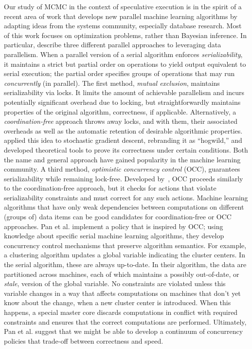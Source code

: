 \documentclass[angelino.tex]{subfiles}
\begin{document}
Our study of MCMC in the context of speculative execution is in the spirit of
a recent area of work that develops new parallel machine learning algorithms
by adapting ideas from the systems community, especially database research.
Most of this work focuses on optimization problems, rather than Bayesian inference.
%
In particular, \citet{pan:2013-optimistic} describe three different parallel
approaches to leveraging data parallelism.
%
When a parallel version of a serial algorithm enforces \emph{serializability},
it maintains a strict but partial order on operations to yield output equivalent
to serial execution; the partial order specifies groups of operations that may
run \emph{concurrently} (in parallel).
%
The first method, \emph{mutual exclusion}, maintains serializability via locks.
It limits the amount of achievable parallelism
and incurs potentially significant overhead due to locking,
but straightforwardly maintains properties of the original algorithm,
\eg correctness, if applicable.
%
Alternatively, a \emph{coordination-free} approach throws away locks,
and with them, their associated overheads as well as the automatic
retention of desirable algorithmic properties. 
\citet{recht:2011-hogwild} applied this idea to stochastic gradient descent,
rebranding it as ``hogwild,'' and developed theoretical tools
to prove its correctness under certain conditions. 
Both the name and general approach have gained popularity in the machine learning community.
%
A third method, \emph{optimistic concurrency control} (OCC), guarantees
serializability while remaining lock-free.
Developed by~\citet{kung:1981-optimistic}, OCC proceeds similarly to the 
coordination-free approach, but it checks for actions that
violate serializability constraints and must correct for any such actions.
%
Machine learning algorithms that have only weak dependencies between
computations on different (groups of) data items can be good candidates for 
coordination-free or OCC approaches.
%
Pan et al. implement a policy that is inspired by OCC;
using knowledge about specific serial machine learning algorithms,
they develop concurrency control mechanisms that preserve algorithm semantics.
%
For example, a clustering algorithm updates
a global variable indicating the cluster centers.
In the serial algorithm, these are always up-to-date.
In their algorithm, the data are partitioned across machines, each of which
maintains a possibly out-of-date, or \emph{stale}, version of the global variable.
No constraints are violated unless this variable changes in a way that affects
computations on machines that don't yet know about the change,
\eg when a new cluster center is introduced.
When this happens, a special master core discards computations in conflict with
required constraints and ensures that the correct computations are performed.
%
Ultimately, Pan et al. suggest that we might be able to develop a continuum of
concurrency policies that trade-off between correctness and speed.
\end{document}

